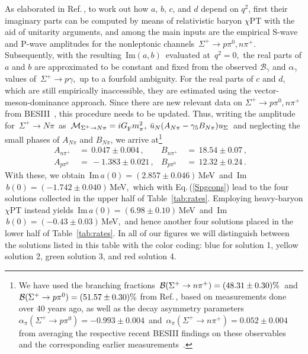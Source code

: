 \documentclass[amsmath,amssymb,aps,nofootinbib,prd,preprint,superscriptaddress,tightenlines,a4paper,bm]{revtex4-2}
\begin{document}
As elaborated in Ref.\,\cite{He:2005yn}, to work out how $a$, $b$, $c$, and $d$ depend on $q^2$, first their imaginary parts can be computed by means of relativistic baryon $\chi$PT with the aid of unitarity arguments, and among the main inputs are the empirical S-wave and P-wave amplitudes for the nonleptonic channels \,$\Sigma^+\to p\pi^0,n\pi^+$.\,
Subsequently, with the resulting \,Im$(a,b)$\, evaluated at \,$q^2=0$,\, the real parts of $a$ and $b$ are approximated to be constant and fixed from the observed $\mathscr B_\gamma$ and $\alpha_\gamma$ values of \,$\Sigma^+\to p\gamma$,\, up to a fourfold ambiguity.
For the real parts of $c$ and $d$, which are still empirically inaccessible, they are estimated using the vector-meson-dominance approach.
Since there are new relevant data on  $\Sigma^+\to p\pi^0,n\pi^+$\, from BESIII~\cite{BESIII:2020fqg,BESIII:2023sgt}, this procedure needs to be updated.
Thus, writing the amplitude for \,$\Sigma^+\to N\pi$\, as \,${\cal M}_{\Sigma^+\to N\pi} = iG_{\rm F}^{}m_{\pi^+}^2\, \bar u_N (A_{N\pi} - \gamma_5B_{N\pi}) u_\Sigma$\, and neglecting the small phases of $A_{N\pi}$ and $B_{N\pi}$, we arrive at\footnote{We have used the branching fractions \,${\cal B}(\Sigma^+\to n\pi^+)=(48.31\pm0.30)\%$\, and \,${\cal B}(\Sigma^+\to p\pi^0)=(51.57\pm0.30)\%$  from Ref.\,\cite{Workman:2022ynf}, based on measurements done over 40 years ago,
as well as the decay asymmetry parameters  $\alpha_\pi(\Sigma^+\to p\pi^0)=-0.993\pm0.004$\, and \,$\alpha_\pi(\Sigma^+\to n\pi^+)=0.052\pm0.004$\, from averaging the respective recent BESIII findings on these observables~\cite{BESIII:2020fqg,BESIII:2023sgt} and the corresponding earlier measurements~\cite{Bangerter:1969fta,Harris:1970kq,Bellamy:1972fa,Lipman:1973mz}.}
\begin{align}
A_{n\pi^+} & \,=\, 0.047\pm0.004 \,, & B_{n\pi^+} & \,=\, 18.54\pm0.07 \,, &
\nonumber \\
A_{p\pi^0} & \,=\, -1.383\pm0.021 \,, & B_{p\pi^0} & \,=\, 12.32\pm0.24 \,.
\label{eq:abpars}
\end{align}
With these, we obtain \,Im$\,a(0) = (2.857\pm0.046)$\,MeV\, and \,Im$\,b(0) = (-1.742\pm0.040)$\,MeV,\, which with Eq.\,(\ref{Spgcons}) lead to the four solutions collected in the upper half of Table~\ref{tab:rates}.
Employing heavy-baryon $\chi$PT instead yields \,Im$\,a(0) = (6.98\pm0.10)$\,MeV\, and \,Im$\,b(0) = (-0.43\pm0.03)$\,MeV,\, and hence another four solutions placed in the lower half of Table~\ref{tab:rates}.
In all of our figures we will distinguish between the solutions listed in this table with the color coding: blue for solution 1, yellow solution 2, green solution 3, and red solution 4.
\end{document}
